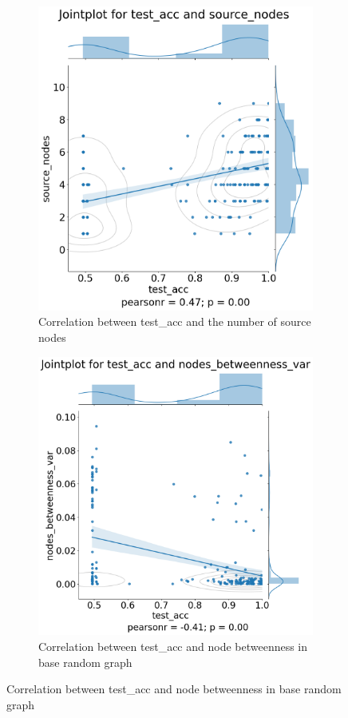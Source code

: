 \begin{figure}[H]
    \bigskip
    \begin{subfigure}{0.45\textwidth}
        \includegraphics[width=\linewidth]{images/results/random/relu/jointplot_test_acc_source_nodes.png}
        \caption{Correlation between test\_acc and the number of source nodes} \label{fig:jp_relu_source}
    \end{subfigure}
    \hfill
    \begin{subfigure}{0.45\textwidth}
        \includegraphics[width=\linewidth]{images/results/random/relu/jointplot_test_acc_nodes_betweenness_var.png}
        \caption{Correlation between test\_acc and node betweenness in base random graph} \label{fig:jp_relu_between}
    \end{subfigure}


\end{figure}
